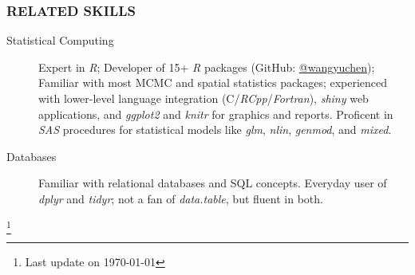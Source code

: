 \documentclass[11pt]{article}
\newcommand{\CPP}
{C\nolinebreak[4]\hspace{0em}\raisebox{.12ex}{\footnotesize\bf ++}}
\begin{document}
	\subsubsection*{\centering RELATED SKILLS}
	\vspace{-.3em}

	\begin{description}
		\item[Statistical Computing] Expert in \emph{R}; Developer of 15+ \emph{R}
		packages (GitHub: \href{https://www.github.com/wangyuchen}{@wangyuchen});
		Familiar with most MCMC and spatial statistics packages; experienced with lower-level language integration (\CPP{}/\emph{RCpp}/\emph{Fortran}),   \emph{shiny} web applications, and \emph{ggplot2} and \emph{knitr} for graphics and reports. Proficent in \emph{SAS} procedures for statistical models like \emph{glm}, \emph{nlin}, \emph{genmod}, and \emph{mixed}.
		\item[Databases] Familiar with relational databases and SQL concepts. Everyday user of \emph{dplyr} and \emph{tidyr}; not a fan of \emph{data.table}, but fluent in both.
	\end{description}

\let\thefootnote\relax\footnote{Last update on \today}
\end{document}
